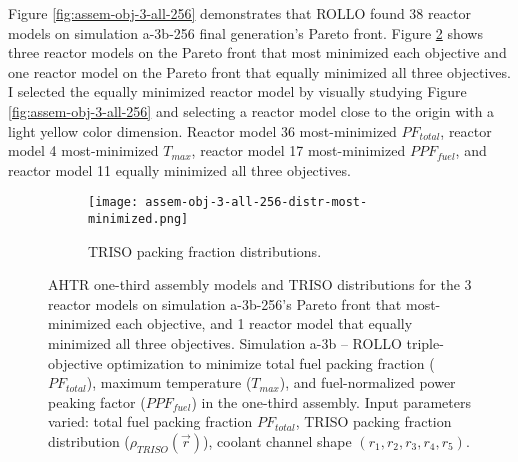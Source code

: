 Figure \ref{fig:assem-obj-3-all-256} demonstrates that \gls{ROLLO} found 38 reactor 
models on simulation a-3b-256 final generation's Pareto front. 
Figure \ref{fig:assem-obj-3-all-256-most-minimized} shows three reactor models on the 
Pareto front that most minimized each objective and one reactor model on the 
Pareto front that equally minimized all three objectives. 
I selected the equally minimized reactor model by visually studying Figure 
\ref{fig:assem-obj-3-all-256} and selecting a reactor model close to the origin 
with a light yellow color dimension. 
Reactor model 36 most-minimized $PF_{total}$, reactor model 4 most-minimized $T_{max}$, 
reactor model 17 most-minimized $PPF_{fuel}$, and reactor model 11 equally minimized 
all three objectives. 
\begin{figure}[htbp!]
    \centering
    \begin{subfigure}{\textwidth}
    \centering
    \texttt{[image: assem-obj-3-all-256-distr-most-minimized.png]}
    \caption{TRISO packing fraction distributions.}
    \label{fig:assem-obj-3-all-256-most-minimized-distr}
    \end{subfigure}
    \caption{AHTR one-third assembly models and TRISO distributions for the 3 reactor 
    models on simulation a-3b-256's Pareto front that most-minimized each objective, and 
    1 reactor model that equally minimized all three objectives.
    Simulation a-3b -- ROLLO triple-objective optimization to minimize 
    total fuel packing fraction ($PF_{total}$), maximum temperature ($T_{max}$), 
    and fuel-normalized power peaking factor ($PPF_{fuel}$) in the one-third assembly. 
    Input parameters varied: total fuel packing fraction $PF_{total}$, 
    TRISO packing fraction distribution ($\rho_{TRISO}(\vec{r})$), 
    coolant channel shape $(r_1, r_2, r_3, r_4, r_5)$.}
    \label{fig:assem-obj-3-all-256-most-minimized}
\end{figure}
